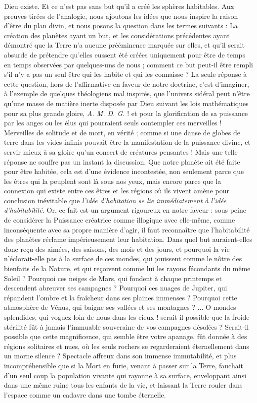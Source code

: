 \documentclass[a4paper, 11pt, oneside]{article}
\begin{document}
Dieu existe. Et ce n'est pas sans but qu'il a créé les sphères habitables. Aux preuves tirées de l'analogie, nous ajoutons les idées que nous inspire la raison d'être du plan divin, et nous posons la question dans les termes suivants : La création des planètes ayant un but, et les considérations précédentes ayant démontré que la Terre n'a aucune prééminence marquée sur elles, et qu'il serait absurde de prétendre qu'elles eussent été créées uniquement pour être de temps en temps observées par quelques-uns de nous ; comment ce but peut-il être rempli s'il n'y a pas un seul être qui les habite et qui les connaisse ? La seule réponse à cette question, hors de l'affirmative en faveur de notre doctrine, c'est d'imaginer, à l'exemple de quelques théologiens mal inspirés, que l'univers sidéral peut n'être qu'une masse de matière inerte disposée par Dieu suivant les lois mathématiques pour sa plus grande gloire, \emph{A. M. D. G.} ! et pour la glorification de sa puissance par les anges ou les élus qui pourraient seuls contempler ces merveilles ! Merveilles de solitude et de mort, en vérité ; comme si une danse de globes de terre dans les vides infinis pouvait être la manifestation de la puissance divine, et servir mieux à sa gloire qu'un concert de créatures pensantes ! Mais une telle réponse ne souffre pas un instant la discussion. Que notre planète ait été faite pour être habitée, cela est d'une évidence incontestée, non seulement parce que les êtres qui la peuplent sont là sous nos yeux, mais encore parce que la connexion qui existe entre ces êtres et les régions où ils vivent amène pour conclusion inévitable que \emph{l'idée d'habitation se lie immédiatement à l'idée d'habitabilité}. Or, ce fait est un argument rigoureux en notre faveur : sous peine de considérer la Puissance créatrice comme illogique avec elle-même, comme inconséquente avec sa propre manière d'agir, il faut reconnaître que l'habitabilité des planètes réclame impérieusement leur habitation. Dans quel but auraient-elles donc reçu des aimées, des saisons, des mois et des jours, et pourquoi la vie n'éclorait-elle pas à la surface de ces mondes, qui jouissent comme le nôtre des bienfaits de la Nature, et qui reçoivent comme lui les rayons fécondants du même Soleil ? Pourquoi ces neiges de Mars, qui fondent à chaque printemps et descendent abreuver ses campagnes ? Pourquoi ces nuages de Jupiter, qui répandent l'ombre et la fraîcheur dans ses plaines immenses ? Pourquoi cette atmosphère de Vénus, qui baigne ses vallées et ses montagnes ? ... O mondes splendides, qui voguez loin de nous dans les cieux ! serait-il possible que la froide stérilité fût à jamais l'immuable souveraine de vos campagnes désolées ? Serait-il possible que cette magnificence, qui semble être votre apanage, fût donnée à des régions solitaires et nues, où les seuls rochers se regarderaient éternellement dans un morne silence ? Spectacle affreux dans son immense immutabilité, et plus incompréhensible que si la Mort en furie, venant à passer sur la Terre, fauchait d'un seul coup la population vivante qui rayonne à sa surface, enveloppant ainsi dans une même ruine tous les enfants de la vie, et laissant la Terre rouler dans l'espace comme un cadavre dans une tombe éternelle.
\clearpage
\end{document}
